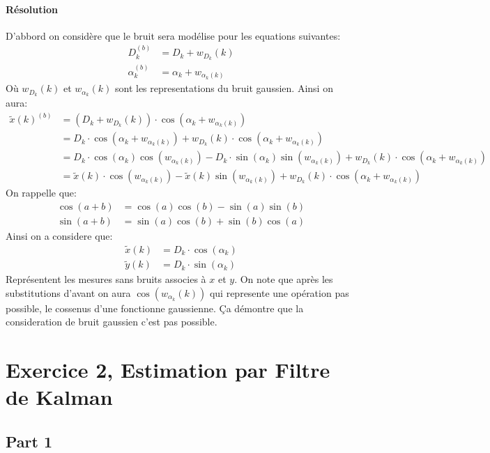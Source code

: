 \documentclass{article}
\begin{document}
\paragraph{Résolution}D'abbord on considère que le bruit sera modélise pour les equations suivantes:
\begin{align*}
    D_{k}^{(b)} &= D_{k} + w_{D_{k}}(k)\\
    \alpha_{k}^{(b)} &= \alpha_{k} + w_{\alpha_{k}(k)}
\end{align*}
Où $w_{D_{k}}(k)$ et $w_{\alpha_{k}}(k)$ sont les representations du bruit gaussien. Ainsi on aura:
\begin{align*}
    \tilde{x}(k)^{(b)} &= (D_{k} + w_{D_{k}}(k)) \cdot \cos(\alpha_{k} + w_{\alpha_{k}(k)})\\
    &= D_{k} \cdot \cos(\alpha_{k} + w_{\alpha_{k}(k)}) + w_{D_{k}}(k) \cdot \cos(\alpha_{k} + w_{\alpha_{k}(k)})\\
    &= D_{k} \cdot \cos(\alpha_{k})\cos(w_{\alpha_{k}(k)}) - D_{k} \cdot \sin(\alpha_{k})\sin(w_{\alpha_{k}(k)}) + w_{D_{k}}(k) \cdot \cos(\alpha_{k} + w_{\alpha_{k}(k)})\\
    &= \boxed{\tilde{x}(k) \cdot \cos(w_{\alpha_{k}(k)})} - \boxed{\tilde{x}(k)\sin(w_{\alpha_{k}(k)})} + w_{D_{k}}(k) \cdot \cos(\alpha_{k} + w_{\alpha_{k}(k)})
\end{align*}
On rappelle que:
\begin{align*}
    \cos(a + b) &= \cos(a)\cos(b) - \sin(a)\sin(b)\\
    \sin(a + b) &= \sin(a)\cos(b) + \sin(b)\cos(a)
\end{align*}
Ainsi on a considere que:
\begin{align*}
    \tilde{x}(k) &= D_{k} \cdot \cos(\alpha_{k})\\
    \tilde{y}(k) &= D_{k} \cdot \sin(\alpha_{k})
\end{align*}
Représentent les mesures sans bruits associes à $x$ et $y$. On note que après les substitutions d'avant on aura $\cos(w_{\alpha_{k}}(k))$ qui represente une opération pas possible, le cossenus d'une fonctionne gaussienne. Ça démontre que la consideration de bruit gaussien c'est pas possible.


\section{Exercice 2, Estimation par Filtre de Kalman}
\subsection{Part 1}
\end{document}
